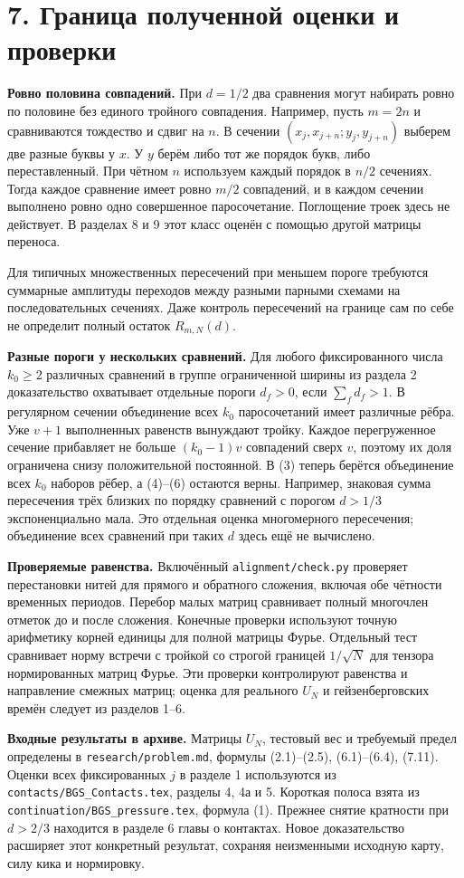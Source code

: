 \documentclass[11pt,a4paper]{article}
\newcommand{\sect}[1]{\section*{\sffamily\color{ink}#1}}
\newcommand{\subt}[1]{\par\medskip\noindent\textbf{#1.}\quad}
\begin{document}
\newpage
\sect{7. Граница полученной оценки и проверки}
\subt{Ровно половина совпадений}
При \(d=1/2\) два сравнения могут набирать ровно по половине без единого тройного совпадения. Например, пусть \(m=2n\) и сравниваются тождество и сдвиг на \(n\). В сечении \((x_j,x_{j+n};y_j,y_{j+n})\) выберем две разные буквы у \(x\). У \(y\) берём либо тот же порядок букв, либо переставленный. При чётном \(n\) используем каждый порядок в \(n/2\) сечениях. Тогда каждое сравнение имеет ровно \(m/2\) совпадений, и в каждом сечении выполнено ровно одно совершенное паросочетание. Поглощение троек здесь не действует. В разделах 8 и 9 этот класс оценён с помощью другой матрицы переноса.

Для типичных множественных пересечений при меньшем пороге требуются суммарные амплитуды переходов между разными парными схемами на последовательных сечениях. Даже контроль пересечений на границе сам по себе не определит полный остаток \(R_{m,N}(d)\).

\subt{Разные пороги у нескольких сравнений}
Для любого фиксированного числа \(k_0\ge2\) различных сравнений в группе ограниченной ширины из раздела 2 доказательство охватывает отдельные пороги \(d_f>0\), если \(\sum_f d_f>1\). В регулярном сечении объединение всех \(k_0\) паросочетаний имеет различные рёбра. Уже \(v+1\) выполненных равенств вынуждают тройку. Каждое перегруженное сечение прибавляет не больше \((k_0-1)v\) совпадений сверх \(v\), поэтому их доля ограничена снизу положительной постоянной. В (3) теперь берётся объединение всех \(k_0\) наборов рёбер, а (4)--(6) остаются верны. Например, знаковая сумма пересечения трёх близких по порядку сравнений с порогом \(d>1/3\) экспоненциально мала. Это отдельная оценка многомерного пересечения; объединение всех сравнений при таких \(d\) здесь ещё не вычислено.

\subt{Проверяемые равенства}
Включённый \texttt{alignment/check.py} проверяет перестановки нитей для прямого и обратного сложения, включая обе чётности временных периодов. Перебор малых матриц сравнивает полный многочлен отметок до и после сложения. Конечные проверки используют точную арифметику корней единицы для полной матрицы Фурье. Отдельный тест сравнивает норму встречи с тройкой со строгой границей \(1/\sqrt N\) для тензора нормированных матриц Фурье. Эти проверки контролируют равенства и направление смежных матриц; оценка для реального \(U_N\) и гейзенберговских времён следует из разделов 1--6.

\subt{Входные результаты в архиве}
Матрицы \(U_N\), тестовый вес и требуемый предел определены в \texttt{research/problem.md}, формулы (2.1)--(2.5), (6.1)--(6.4), (7.11). Оценки всех фиксированных \(j\) в разделе 1 используются из \texttt{contacts/BGS\_Contacts.tex}, разделы 4, 4а и 5. Короткая полоса взята из \texttt{continuation/BGS\_pressure.tex}, формула (1). Прежнее снятие кратности при \(d>2/3\) находится в разделе 6 главы о контактах. Новое доказательство расширяет этот конкретный результат, сохраняя неизменными исходную карту, силу кика и нормировку.
\end{document}
